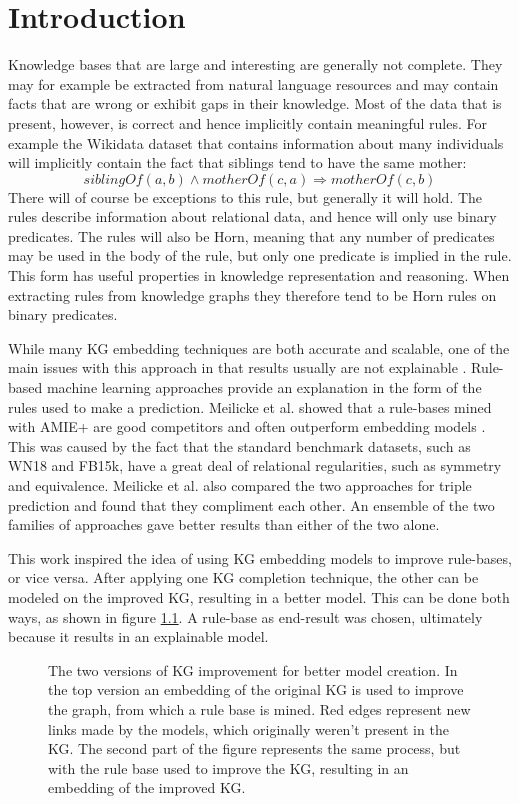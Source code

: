 \chapter{Introduction}

Knowledge bases that are large and interesting are generally not complete. They may for example be extracted from natural language resources and may contain facts that are wrong or exhibit gaps in their knowledge. Most of the data that is present, however, is correct and hence implicitly contain meaningful rules. For example the Wikidata dataset that contains information about many individuals will implicitly contain the fact that siblings tend to have the same mother:
\[siblingOf(a, b) \wedge motherOf(c, a) \Rightarrow motherOf(c, b)\]
There will of course be exceptions to this rule, but generally it will hold. The rules describe information about relational data, and hence will only use binary predicates. The rules will also be Horn, meaning that any number of predicates may be used in the body of the rule, but only one predicate is implied in the rule. This form has useful properties in knowledge representation and reasoning. When extracting rules from knowledge graphs they therefore tend to be Horn rules on binary predicates.

While many KG embedding techniques are both accurate and scalable, one of the main issues with this approach in that results usually are not explainable \cite{bonatti2019knowledge}. Rule-based machine learning approaches provide an explanation in the form of the rules used to make a prediction.  Meilicke et al. showed that a rule-bases mined with AMIE+ are good competitors and often outperform embedding models \cite{ensemble}. This was caused by the fact that the standard benchmark datasets, such as WN18 and FB15k,  have a great deal of relational regularities, such as symmetry and equivalence. Meilicke et al. also compared the two approaches for triple prediction and found that they compliment each other. An ensemble of the two families of approaches gave better results than either of the two alone.

This work inspired the idea of using KG embedding models to improve rule-bases, or vice versa. After applying one KG completion technique, the other can be modeled on the improved KG, resulting in a better model. This can be done both ways, as shown in figure \ref{rule_based_and_embedding}. A rule-base as end-result was chosen, ultimately because it results in an explainable model. 

\begin{figure}[htp]
    \centering
    
    \caption[Figure representing the process.]{The two versions of KG improvement for better model creation. In the top version an embedding of the original KG is used to improve the graph, from which a rule base is mined. Red edges represent new links made by the models, which originally weren't present in the KG. The second part of the figure represents the same process, but with the rule base used to improve the KG, resulting in an embedding of the improved KG. }
    \label{rule_based_and_embedding}
\end{figure}

